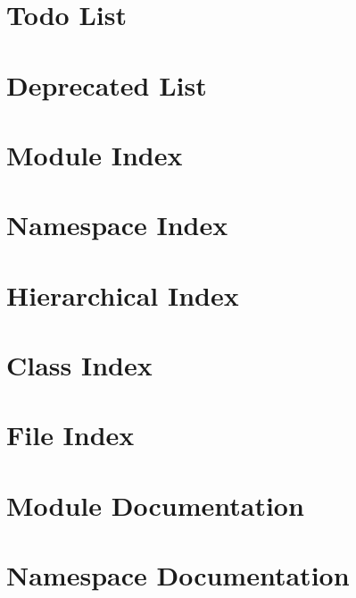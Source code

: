 \let\mypdfximage\pdfximage\def\pdfximage{\immediate\mypdfximage}\documentclass[twoside]{book}
\newcommand{\+}{\discretionary{\mbox{\scriptsize$\hookleftarrow$}}{}{}}
\begin{document}
\chapter{Todo List}
\label{a00386}

\chapter{Deprecated List}
\label{a00387}

\chapter{Module Index}

\chapter{Namespace Index}

\chapter{Hierarchical Index}

\chapter{Class Index}

\chapter{File Index}

\chapter{Module Documentation}







\chapter{Namespace Documentation}





























\end{document}
